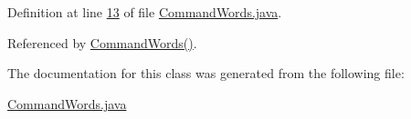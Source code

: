 Definition at line \hyperlink{CommandWords_8java_source_l00013}{13} of file \hyperlink{CommandWords_8java_source}{Command\-Words.\-java}.



Referenced by \hyperlink{CommandWords_8java_source_l00018}{Command\-Words()}.



The documentation for this class was generated from the following file\-:\begin{DoxyCompactItemize}
\item 
\hyperlink{CommandWords_8java}{Command\-Words.\-java}\end{DoxyCompactItemize}
